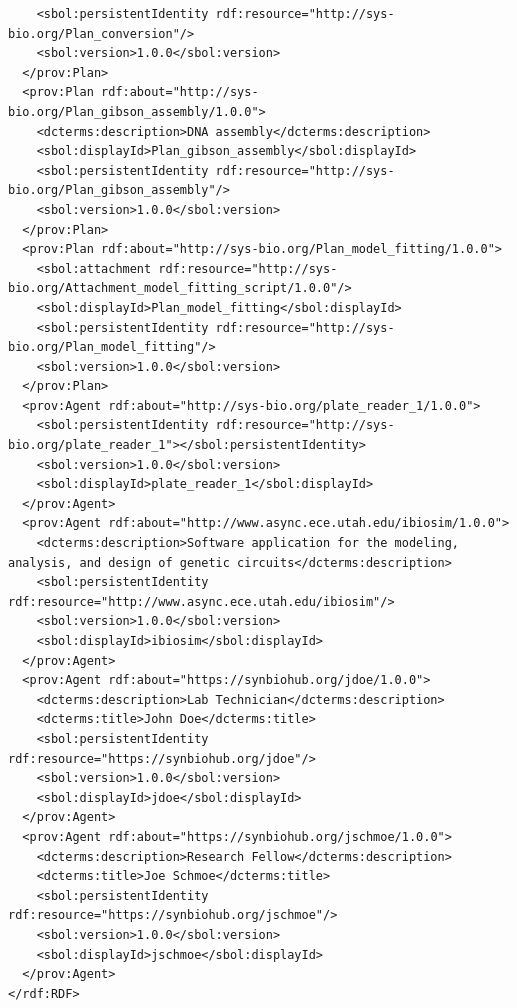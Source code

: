 \begin{lstlisting}
    <sbol:persistentIdentity rdf:resource="http://sys-bio.org/Plan_conversion"/>
    <sbol:version>1.0.0</sbol:version>
  </prov:Plan>
  <prov:Plan rdf:about="http://sys-bio.org/Plan_gibson_assembly/1.0.0">
    <dcterms:description>DNA assembly</dcterms:description>
    <sbol:displayId>Plan_gibson_assembly</sbol:displayId>
    <sbol:persistentIdentity rdf:resource="http://sys-bio.org/Plan_gibson_assembly"/>
    <sbol:version>1.0.0</sbol:version>
  </prov:Plan>
  <prov:Plan rdf:about="http://sys-bio.org/Plan_model_fitting/1.0.0">
    <sbol:attachment rdf:resource="http://sys-bio.org/Attachment_model_fitting_script/1.0.0"/>
    <sbol:displayId>Plan_model_fitting</sbol:displayId>
    <sbol:persistentIdentity rdf:resource="http://sys-bio.org/Plan_model_fitting"/>
    <sbol:version>1.0.0</sbol:version>
  </prov:Plan>
  <prov:Agent rdf:about="http://sys-bio.org/plate_reader_1/1.0.0">
    <sbol:persistentIdentity rdf:resource="http://sys-bio.org/plate_reader_1"></sbol:persistentIdentity>
    <sbol:version>1.0.0</sbol:version>
    <sbol:displayId>plate_reader_1</sbol:displayId>
  </prov:Agent>
  <prov:Agent rdf:about="http://www.async.ece.utah.edu/ibiosim/1.0.0">
    <dcterms:description>Software application for the modeling, analysis, and design of genetic circuits</dcterms:description>
    <sbol:persistentIdentity rdf:resource="http://www.async.ece.utah.edu/ibiosim"/>
    <sbol:version>1.0.0</sbol:version>
    <sbol:displayId>ibiosim</sbol:displayId>
  </prov:Agent>
  <prov:Agent rdf:about="https://synbiohub.org/jdoe/1.0.0">
    <dcterms:description>Lab Technician</dcterms:description>
    <dcterms:title>John Doe</dcterms:title>
    <sbol:persistentIdentity rdf:resource="https://synbiohub.org/jdoe"/>
    <sbol:version>1.0.0</sbol:version>
    <sbol:displayId>jdoe</sbol:displayId>
  </prov:Agent>
  <prov:Agent rdf:about="https://synbiohub.org/jschmoe/1.0.0">
    <dcterms:description>Research Fellow</dcterms:description>
    <dcterms:title>Joe Schmoe</dcterms:title>
    <sbol:persistentIdentity rdf:resource="https://synbiohub.org/jschmoe"/>
    <sbol:version>1.0.0</sbol:version>
    <sbol:displayId>jschmoe</sbol:displayId>
  </prov:Agent>
</rdf:RDF>
\end{lstlisting}


